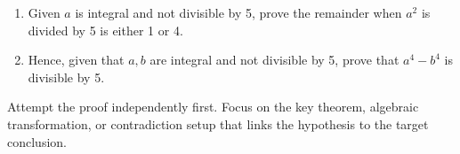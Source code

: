 
\begin{problem}
\begin{enumerate}[label=(\alph*)]
    \item Given $a$ is integral and not divisible by 5, prove the remainder when $a^2$ is divided by 5 is either 1 or 4.
    
    \item Hence, given that $a, b$ are integral and not divisible by 5, prove that $a^4 - b^4$ is divisible by 5.
\end{enumerate}
\end{problem}

\begin{hint}
Attempt the proof independently first. Focus on the key theorem, algebraic transformation, or contradiction setup that links the hypothesis to the target conclusion.
\end{hint}

